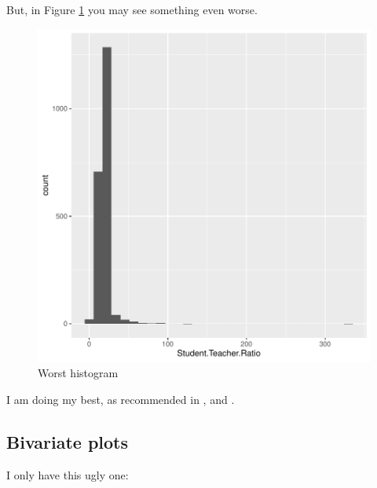 \documentclass[a4paper, 12pt]{article}
\begin{document}
But, in Figure \ref{fig:theDeli_2} you may see something even worse.

\begin{figure}[h]
\centering
\includegraphics{draft_paper-theDeli_2}
\caption{Worst histogram}  %
\label{fig:theDeli_2} %
\end{figure}
I am doing my best, as recommended in \citet{magallanes_reyes_data_2022}, and \citet{leisch_sweave_2024}. 

\subsection{Bivariate plots}

I only have this ugly one:
\end{document}
